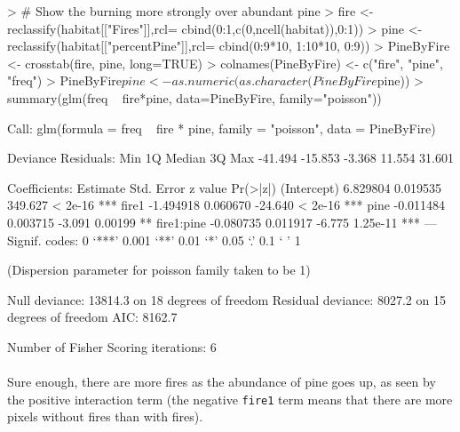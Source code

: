 \documentclass{article}
\begin{document}
\begin{Schunk}
\begin{Sinput}
> # Show the burning more strongly over abundant pine
> fire <- reclassify(habitat[["Fires"]],rcl= cbind(0:1,c(0,ncell(habitat)),0:1))
> pine <- reclassify(habitat[["percentPine"]],rcl= cbind(0:9*10, 1:10*10, 0:9))
> PineByFire <- crosstab(fire, pine, long=TRUE)
> colnames(PineByFire) <- c("fire", "pine", "freq")
> PineByFire$pine <- as.numeric(as.character(PineByFire$pine))
> summary(glm(freq ~ fire*pine, data=PineByFire, family="poisson"))
\end{Sinput}
\begin{Soutput}
Call:
glm(formula = freq ~ fire * pine, family = "poisson", data = PineByFire)

Deviance Residuals: 
    Min       1Q   Median       3Q      Max  
-41.494  -15.853   -3.368   11.554   31.601  

Coefficients:
             Estimate Std. Error z value Pr(>|z|)    
(Intercept)  6.829804   0.019535 349.627  < 2e-16 ***
fire1       -1.494918   0.060670 -24.640  < 2e-16 ***
pine        -0.011484   0.003715  -3.091  0.00199 ** 
fire1:pine  -0.080735   0.011917  -6.775 1.25e-11 ***
---
Signif. codes:  0 ‘***’ 0.001 ‘**’ 0.01 ‘*’ 0.05 ‘.’ 0.1 ‘ ’ 1

(Dispersion parameter for poisson family taken to be 1)

    Null deviance: 13814.3  on 18  degrees of freedom
Residual deviance:  8027.2  on 15  degrees of freedom
AIC: 8162.7

Number of Fisher Scoring iterations: 6
\end{Soutput}
\end{Schunk}

\paragraph{}
Sure enough, there are more fires as the abundance of pine goes up, as seen by the positive interaction term (the negative \texttt{fire1} term means that there are more pixels without fires than with fires).
\end{document}
